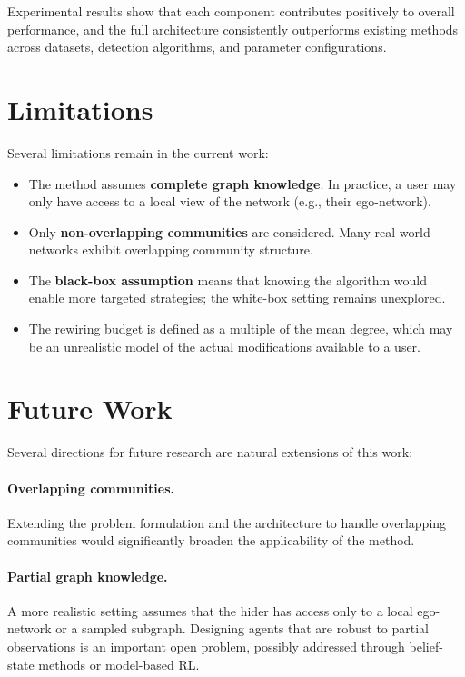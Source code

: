 \documentclass[11pt,a4paper,twoside]{tesis}
\begin{document}
Experimental results show that each component contributes positively to overall
performance, and the full architecture consistently outperforms existing methods across
datasets, detection algorithms, and parameter configurations.

\section{Limitations}
\label{sec:limitations}

Several limitations remain in the current work:
\begin{itemize}
    \item The method assumes \textbf{complete graph knowledge}. In practice, a user may
          only have access to a local view of the network (e.g., their ego-network).
    \item Only \textbf{non-overlapping communities} are considered. Many real-world
          networks exhibit overlapping community structure.
    \item The \textbf{black-box assumption} means that knowing the algorithm would enable
          more targeted strategies; the white-box setting remains unexplored.
    \item The rewiring budget is defined as a multiple of the mean degree, which may
          be an unrealistic model of the actual modifications available to a user.
\end{itemize}

\section{Future Work}
\label{sec:future}

Several directions for future research are natural extensions of this work:

\paragraph{Overlapping communities.}
Extending the problem formulation and the architecture to handle overlapping communities
would significantly broaden the applicability of the method.

\paragraph{Partial graph knowledge.}
A more realistic setting assumes that the hider has access only to a local ego-network
or a sampled subgraph. Designing agents that are robust to partial observations is an
important open problem, possibly addressed through belief-state methods or model-based RL.
\end{document}
